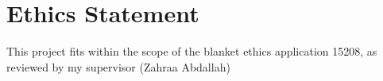 \documentclass[ %
                    author={Rzan Alkabier},
                    supervisor={Dr. Zahraa Abdallah},
                    degree={MSc},
                     title={Denoising Extracellular Recording for Spike Detection and Classification on Single Channels},
                    subtitle={Does denoising improve detection and classification performance?},
                      type={},
                      year={2026}]{dissertation}
\begin{document}




\maketitle


\frontmatter


\makedecl


\tableofcontents
\listoffigures
\listoftables


\chapter*{Ethics Statement}
\noindent
This project fits within the scope of the blanket ethics application 15208, as reviewed by my supervisor (Zahraa Abdallah)
\end{document}
